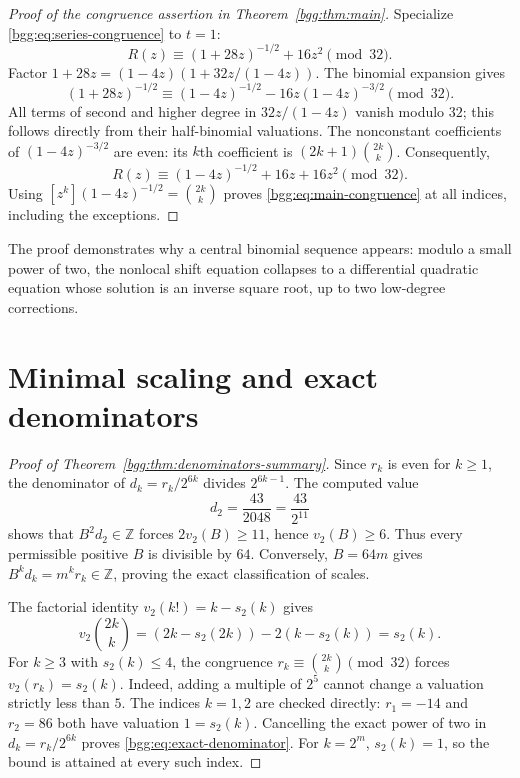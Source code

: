 \documentclass[11pt,a4paper]{article}
\numberwithin{equation}{section}
\theoremstyle{definition}
\theoremstyle{remark}
\theoremstyle{definition}
\newcommand{\Z}{\mathbb Z}
\begin{document}
\begin{proof}[Proof of the congruence assertion in Theorem~\ref{bgg:thm:main}]
Specialize \eqref{bgg:eq:series-congruence} to $t=1$:
\[
 R(z)\equiv(1+28z)^{-1/2}+16z^2\pmod{32}.
\]
Factor $1+28z=(1-4z)(1+32z/(1-4z))$. The binomial expansion gives
\[
 (1+28z)^{-1/2}
 \equiv(1-4z)^{-1/2}-16z(1-4z)^{-3/2}\pmod{32}.
\]
All terms of second and higher degree in $32z/(1-4z)$ vanish modulo $32$;
this follows directly from their half-binomial valuations. The nonconstant
coefficients of $(1-4z)^{-3/2}$ are even: its $k$th coefficient is
$(2k+1)\binom{2k}{k}$. Consequently,
\begin{equation}\label{bgg:eq:final-R-congruence}
 R(z)\equiv(1-4z)^{-1/2}+16z+16z^2\pmod{32}.
\end{equation}
Using $[z^k](1-4z)^{-1/2}=\binom{2k}{k}$ proves
\eqref{bgg:eq:main-congruence} at all indices, including the exceptions.
\end{proof}

The proof demonstrates why a central binomial sequence appears: modulo a
small power of two, the nonlocal shift equation collapses to a differential
quadratic equation whose solution is an inverse square root, up to two
low-degree corrections.

\section{Minimal scaling and exact denominators}
\label{bgg:sec:denominators}

\begin{proof}[Proof of Theorem~\ref{bgg:thm:denominators-summary}]
Since $r_k$ is even for $k\ge1$, the denominator of $d_k=r_k/2^{6k}$ divides
$2^{6k-1}$. The computed value
\[
 d_2=\frac{43}{2048}=\frac{43}{2^{11}}
\]
shows that $B^2d_2\in\Z$ forces $2v_2(B)\ge11$, hence $v_2(B)\ge6$.
Thus every permissible positive $B$ is divisible by $64$. Conversely,
$B=64m$ gives $B^kd_k=m^kr_k\in\Z$, proving the exact classification of
scales.

The factorial identity $v_2(k!)=k-s_2(k)$ gives
\begin{equation}\label{bgg:eq:central-valuation}
 v_2\binom{2k}{k}
 =(2k-s_2(2k))-2(k-s_2(k))=s_2(k).
\end{equation}
For $k\ge3$ with $s_2(k)\le4$, the congruence
$r_k\equiv\binom{2k}{k}\pmod{32}$ forces
$v_2(r_k)=s_2(k)$. Indeed, adding a multiple of $2^5$ cannot change a
valuation strictly less than $5$. The indices $k=1,2$ are checked directly:
$r_1=-14$ and $r_2=86$ both have valuation $1=s_2(k)$. Cancelling the exact
power of two in $d_k=r_k/2^{6k}$ proves
\eqref{bgg:eq:exact-denominator}. For $k=2^m$, $s_2(k)=1$, so the bound is
attained at every such index.
\end{proof}
\end{document}
